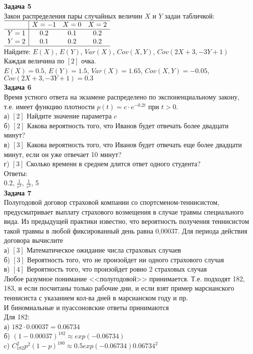 \documentclass[pdftex,12pt,a4paper]{article}
\begin{document}
\textbf{Задача 5} \\
Закон распределения пары случайных величин $X$ и $Y$ задан табличкой: \\
$\begin{array}{c|ccc}
\hline
 & X=-1 & X=0 & X=2 \\
\hline
Y=1 & 0.2 & 0.1 & 0.2 \\
Y=2 & 0.1 & 0.2 & 0.2 \\
\hline
\end{array}$ \\
Найдите: $E(X)$, $E(Y)$, $Var(X)$, $Cov(X,Y)$, $Cov(2X+3,-3Y+1)$ \\
Каждая величина по $[2]$ очка. \\
$E(X)=0.5$, $E(Y)=1.5$, $Var(X)=1.65$, $Cov(X,Y)=-0.05$, $Cov(2X+3,-3Y+1)=0.3$ \\

\textbf{Задача 6} \\ %
Время устного ответа на экзамене распределено по экспоненциальному закону, т.е. имеет функцию плотности $p(t)=c\cdot e^{-0.2t}$ при $t>0$. \\
а) $[2]$ Найдите значение параметра $c$ \\
б) $[2]$ Какова вероятность того, что Иванов будет отвечать более двадцати минут? \\
в) $[3]$ Какова вероятность того, что Иванов будет отвечать еще более двадцати минут, если он уже отвечает 10 минут? \\
г) $[3]$ Сколько времени в среднем длится ответ одного студента? \\
Ответы: \\
0.2, $\frac{1}{e^4}$, $\frac{1}{e^4}$, 5 \\

\textbf{Задача 7} \\ %
Полугодовой договор страховой компании со спортсменом-теннисистом, предусматривает выплату страхового возмещения  в случае травмы специального вида. Из предыдущей практики известно, что вероятность получения теннисистом такой травмы  в любой фиксированный день равна 0,00037. Для периода действия договора вычислите \\
а) $[3]$ Математическое ожидание числа страховых случаев \\
б) $[3]$ Вероятность того, что не произойдет ни одного страхового случая \\
в) $[4]$ Вероятность того, что произойдет ровно 2 страховых случая \\
Любое разумное понимание <<полугодовой>> принимается. Т.е. подходят 182, 183, и если посчитаны только рабочие дни, и если взят пример марсианского теннисиста с указанием кол-ва дней в марсианском году и пр. \\
И биномиальные и пуассоновские ответы принимаются \\
Для 182: \\
а) $182\cdot 0.00037=0.06734$  \\
б) $(1-0.00037)^182\approx exp(-0.06734)$ \\
c) $C_{182}^{2}p^{2}(1-p)^{180}\approx 0.5exp(-0.06734)0.06734^2$ 
\end{document}
